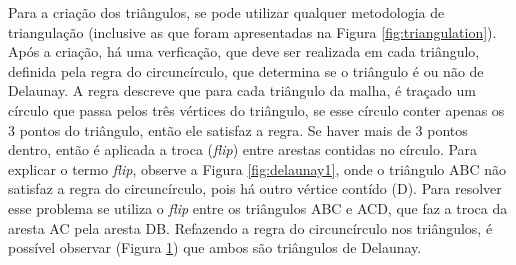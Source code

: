 \begin{figure}[H]
\begin{subfigure}[t]{0.3\textwidth}
        \caption{}
        \label{fig:delaunay2}
    \end{subfigure}
    \label{fig:delaunay}
\end{figure}

Para a criação dos triângulos, se pode utilizar qualquer metodologia de triangulação (inclusive as que foram apresentadas na Figura \ref{fig:triangulation}). Após a criação, há uma verficação, que deve ser realizada em cada triângulo, definida pela regra do circuncírculo, que determina se o triângulo é ou não de Delaunay. 
A regra descreve que para cada triângulo da malha, é traçado um círculo que passa pelos três vértices do triângulo, se esse círculo conter apenas os 3 pontos do triângulo, então ele satisfaz a regra. 
Se haver mais de 3 pontos dentro, então é aplicada a troca (\textit{flip}) entre arestas contidas no círculo. 
Para explicar o termo \textit{flip}, observe a Figura \ref{fig:delaunay1}, onde o triângulo ABC não satisfaz a regra do circuncírculo, pois há outro vértice contído (D). 
Para resolver esse problema se utiliza o \textit{flip} entre os triângulos ABC e ACD, que faz a troca da aresta AC pela aresta DB. 
Refazendo a regra do circuncírculo nos triângulos, é possível observar (Figura \ref{fig:delaunay2}) que ambos são triângulos de Delaunay.

